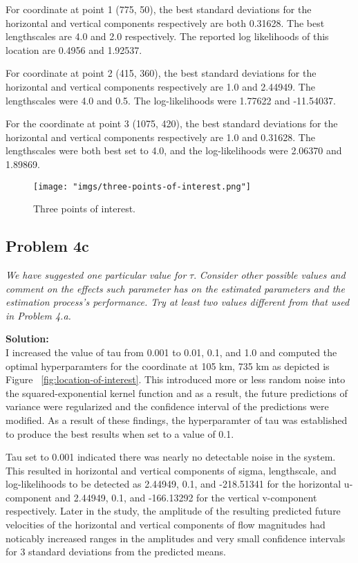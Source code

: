 \documentclass[11pt]{article}
\begin{document}
For coordinate at point 1 (775, 50), the best standard deviations for the horizontal and vertical components respectively are both 0.31628. The best lengthscales are 4.0 and 2.0 respectively. The reported log likelihoods of this location are 0.4956 and 1.92537. 

For coordinate at point 2 (415, 360), the best standard deviations for the horizontal and vertical components respectively are 1.0 and 2.44949. The lengthscales were 4.0 and 0.5. The log-likelihoods were 1.77622 and -11.54037.

For the coordinate at point 3 (1075, 420), the best standard deviations for the horizontal and vertical components respectively are 1.0 and 0.31628. The lengthscales were both best set to 4.0, and the log-likelihoods were 2.06370 and 1.89869.

\begin{figure}[htbp]
    \centering
    \texttt{[image: "imgs/three-points-of-interest.png"]} %
    \caption{Three points of interest.}
    \label{fig:three-points-of-interest}
\end{figure}
\FloatBarrier

\subsection{Problem 4c}

\textit{
    We have suggested one particular value for} 
    $\tau$. 
\textit{Consider other possible values and comment on the effects such parameter has on the estimated parameters and the estimation process's performance. Try at least two values different from that used in Problem 4.a. 
}

\textbf{Solution:} \\
I increased the value of tau from 0.001 to 0.01, 0.1, and 1.0 and computed the optimal hyperparamters for the coordinate at 105 km, 735 km as depicted is Figure ~\ref{fig:location-of-interest}. This introduced more or less random noise into the squared-exponential kernel function and as a result, the future predictions of variance were regularized and the confidence interval of the predictions were modified. As a result of these findings, the hyperparamter of tau was established to produce the best results when set to a value of 0.1. 

Tau set to 0.001 indicated there was nearly no detectable noise in the system. This resulted in horizontal and vertical components of sigma, lengthscale, and log-likelihoods to be detected as 2.44949, 0.1, and -218.51341 for the horizontal u-component and 2.44949, 0.1, and -166.13292 for the vertical v-component respectively. Later in the study, the amplitude of the resulting predicted future velocities of the horizontal and vertical components of flow magnitudes had noticably increased ranges in the amplitudes and very small confidence intervals for 3 standard deviations from the predicted means. 
\end{document}
